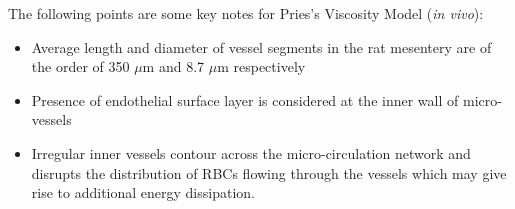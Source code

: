 \noindent The following points are some key notes for Pries's Viscosity Model (\textit{in vivo}):\cite{PriesAR1994RtBF}
\begin{itemize}
    \item Average length and diameter of vessel segments in the rat mesentery are of the order of 350 $\mu$m and 8.7 $\mu$m respectively
    \item Presence of endothelial surface layer is considered at the inner wall of micro-vessels
    \item Irregular inner vessels contour across the micro-circulation network and disrupts the distribution of RBCs flowing through the vessels which may give rise to additional energy dissipation. 
\end{itemize}